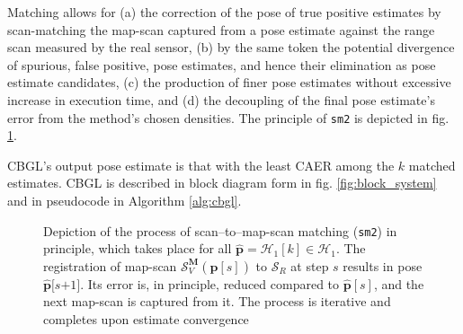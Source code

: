 Matching allows for (a) the correction of the pose of true positive estimates
by scan-matching the map-scan captured from a pose estimate against the range
scan measured by the real sensor, (b) by the same token the potential
divergence of spurious, false positive, pose estimates, and hence their
elimination as pose estimate candidates, (c) the production of finer pose
estimates without excessive increase in execution time, and (d) the decoupling
of the final pose estimate's error from the method's chosen densities. The
principle of \texttt{sm2} is depicted in fig. \ref{fig:sm2_evolution}.

CBGL's output pose estimate is that with the least CAER among the $k$ matched
estimates. CBGL is described in block diagram form in fig.
\ref{fig:block_system} and in pseudocode in Algorithm \ref{alg:cbgl}.

\begin{figure}[H]\vspace{1.5cm}
  
  \caption{\small Depiction of the process of scan--to--map-scan matching
           (\texttt{sm2}) in principle, which takes place for all $\hat{\bm{p}}
           = \mathcal{H}_1[k] \in \mathcal{H}_1$. The registration of map-scan
           $\mathcal{S}_V^{\bm{M}}(\hat{\bm{p}}[s])$ to $\mathcal{S}_R$ at step
           $s$ results in pose $\hat{\bm{p}}[s$$+$$1]$. Its error is, in
           principle, reduced compared to $\hat{\bm{p}}[s]$, and the next
           map-scan is captured from it. The process is iterative and completes
           upon estimate convergence}
  \label{fig:sm2_evolution}
\end{figure}


